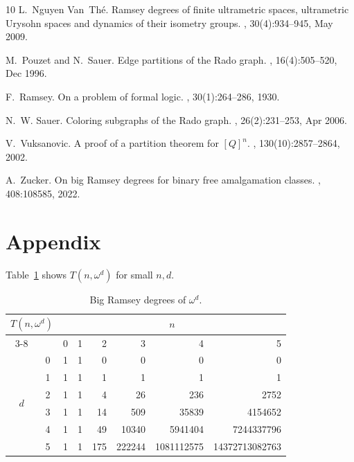\documentclass[11pt]{article}
\newcommand{\om}{\omega}
\newcommand{\numpoints}{n}
\theoremstyle{plain}
\theoremstyle{definition}
\begin{document}
\begin{thebibliography}{10}
L.~Nguyen Van~Th\'e.
\newblock Ramsey degrees of finite ultrametric spaces, ultrametric {U}rysohn
  spaces and dynamics of their isometry groups.
, 30(4):934–945, May 2009.

M.~Pouzet and N.~Sauer.
\newblock Edge partitions of the {R}ado graph.
, 16(4):505--520, Dec 1996.

F.~Ramsey.
\newblock On a problem of formal logic.
, 30(1):264--286, 1930.

N.~W. Sauer.
\newblock Coloring subgraphs of the {R}ado graph.
, 26(2):231--253, Apr 2006.

V.~Vuksanovic.
\newblock A proof of a partition theorem for $[{Q}]^n$.
,
  130(10):2857--2864, 2002.

A.~Zucker.
\newblock On big {R}amsey degrees for binary free amalgamation classes.
, 408:108585, 2022.

\end{thebibliography}

%
%

\section*{Appendix}
Table~\ref{tab:om-d-a} shows $T(\numpoints,\om^d)$ for small $\numpoints,d$.
\begin{table}[htpb]
\centering
\begin{tabular}{| c | c | r | r | r | r | r | r|}
    \hline
     \multicolumn{2}{|c|}{\multirow{2}{*}{$T(n,\om^d)$}}&\multicolumn{6}{c|}{$\numpoints$}\\\cline{3-8}
     \multicolumn{1}{|c}{}&&0&1&2&3&4&5\\\hline
     \multirow{6}{*}{$d$}&0&1&1&0&0&0&0\\\cline{2-8}
     &1&1&1&1&1&1&1\\\cline{2-8}
     &2&1&1&4&26&236&2752\\\cline{2-8}
     &3&1&1&14&509&35839&4154652\\\cline{2-8}
     &4&1&1&49&10340&5941404&7244337796\\\cline{2-8}
     &5&1&1&175&222244&1081112575&14372713082763\\\hline
\end{tabular}
\caption{Big Ramsey degrees of $\om^d$.}
\label{tab:om-d-a}
\end{table}
\end{document}
